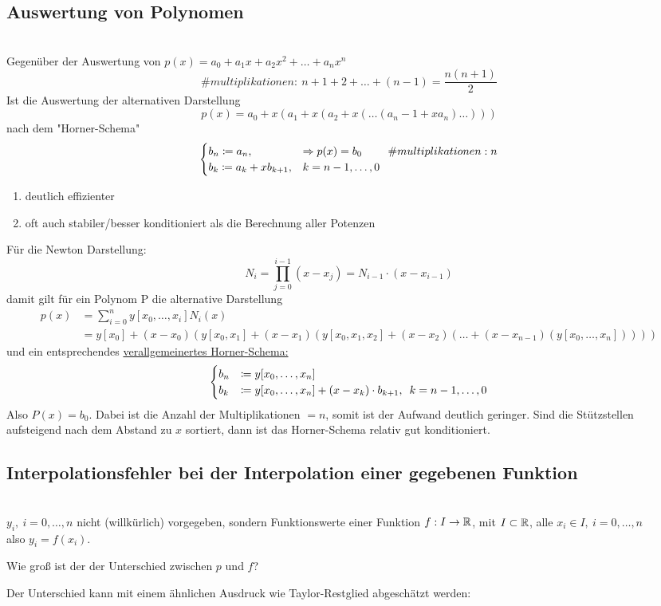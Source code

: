\documentclass[../Skript.tex]{subfiles}
\begin{document}
\subsection{Auswertung von Polynomen}\hfill\\
Gegenüber der Auswertung von $p(x)=a_0+a_1x+a_2x^2+\dots + a_nx^n$
\[\# multiplikationen:\ n+1+2+\dots + (n-1)=\frac{n(n+1)}{2} \]
Ist die Auswertung der alternativen Darstellung \[p(x)=a_0+x(a_1+x(a_2+x(\dots (a_n-1+xa_n)\dots ))) \]
nach dem "Horner-Schema"\[\begin{cases}
        b_n\coloneqq a_n,& \Rightarrow p(x)=b_0\  \largespace\largespace\# multiplikationen: n\\
    b_k\coloneqq a_k+xb_{k+1},&k=n-1,\dots,0
\end{cases}\]
\begin{enumerate}
    \item deutlich effizienter
    \item oft auch stabiler/besser konditioniert als die Berechnung aller Potenzen
\end{enumerate}
Für die Newton Darstellung: \[
    N_i = \prod_{j=0}^{i-1}(x-x_j) = N_{i-1}\cdot(x-x_{i-1})\]
damit gilt für ein Polynom P die alternative Darstellung\begin{align*}
    p(x) &= \sum_{i=0}^n y[x_0,\dots, x_i]N_i(x) \\
         &= y[x_0] + (x-x_0)(y[x_0, x_1] + (x-x_1)(y[x_0,x_1,x_2]+(x-x_2)(\dots + (x-x_{n-1})(y[x_0,\dots,x_n]))))
\end{align*}
und ein entsprechendes \underline{verallgemeinertes Horner-Schema:} \[
    \begin{cases}
        b_n &\coloneqq y[x_0, \dots, x_n]\\
        b_k &\coloneqq y[x_0, \dots, x_n] + (x-x_k)\cdot b_{k+1}, \hspace{.5em} k=n-1,\dots,0
    \end{cases}\]
Also $P(x)=b_0$. Dabei ist die Anzahl der Multiplikationen $=n$, somit ist der Aufwand deutlich geringer.
Sind die Stützstellen aufsteigend nach dem Abstand zu $x$ sortiert, dann ist das 
Horner-Schema relativ gut konditioniert.


\subsection{Interpolationsfehler bei der Interpolation einer gegebenen Funktion}\hfill\\
$y_i, \ i=0,\dots,n $ nicht  (willkürlich) vorgegeben, sondern Funktionswerte einer Funktion $f:I\to\mathbb{R}$, mit $I\subset\mathbb{R}$, 
alle $x_i\in I,\ i=0,\dots,n$\\
also $y_i=f(x_i)$. 
\begin{question} Wie groß ist der der Unterschied zwischen $p$ und $f$?\\
\end{question}
Der Unterschied kann mit einem ähnlichen Ausdruck wie Taylor-Restglied abgeschätzt werden:\\
\end{document}
